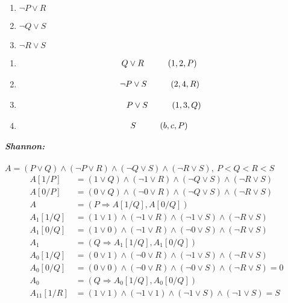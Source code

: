 \documentclass[a4paper,12pt]{article}
\newcommand\tab[1][1cm]{\hspace*{#1}}
\begin{document}
\begin{enumerate}
\begin{multicols}{4}
\begin{enumerate}[(1)]
			\item $\neg P\lor R$
			\item $\neg Q\lor S$
			\item $\neg R\lor S$
		\end{enumerate}
	\end{multicols}
	\begin{multicols}{2}
		\begin{enumerate}
			\item \begin{align*}
				Q\lor R\tab &(1,2,P)
			\end{align*}
			\item \begin{align*}
				\neg P\lor S\tab & (2,4,R) 
			\end{align*}
			\item \begin{align*}
				P\lor S\tab (1,3,Q)
			\end{align*}
			\item \begin{align*}
				S\tab & (b,c,P)
			\end{align*}
		\end{enumerate}
	\end{multicols}
	\emph{\textbf{Shannon:}}\\\\
	$A=(P\lor Q)\land(\neg P\lor R)\land(\neg Q\lor S)\land (\neg R\lor S),\>P<Q<R<S$
	\begin{align*}
		A[1/P]&=(1\lor Q)\land(\neg 1\lor R)\land(\neg Q\lor S)\land (\neg R\lor S)\\
		A[0/P]&=(0\lor Q)\land(\neg 0\lor R)\land(\neg Q\lor S)\land (\neg R\lor S)\\
		A&=(P\Rightarrow A[1/Q],A[0/Q])\\
		A_1[1/Q]&=(1\lor 1)\land(\neg 1\lor R)\land(\neg 1\lor S)\land (\neg R\lor S)\\
		A_1[0/Q]&=(1\lor 0)\land(\neg 1\lor R)\land(\neg 0\lor S)\land (\neg R\lor S)\\
		A_1&=(Q\Rightarrow A_1[1/Q],A_1[0/Q])\\
		A_0[1/Q]&=(0\lor 1)\land(\neg 0\lor R)\land(\neg 1\lor S)\land (\neg R\lor S)\\
		A_0[0/Q]&=(0\lor 0)\land(\neg 0\lor R)\land(\neg 0\lor S)\land (\neg R\lor S)=0\\
		A_0&=(Q\Rightarrow A_0[1/Q],A_0[0/Q])\\
		A_{11}[1/R]&=(1\lor 1)\land(\neg 1\lor 1)\land(\neg 1\lor S)\land (\neg 1\lor S)=S\\

\end{align*}
\end{enumerate}
\end{document}
